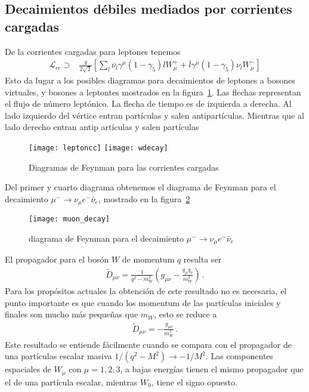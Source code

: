 \subsection{Decaimientos débiles mediados por corrientes cargadas}
\begin{frame}
De la corrientes cargadas para leptones tenemos
\begin{align}
  \mathcal{L}_{cc}\supset&\frac{g}{2\sqrt{2}}\left[\sum_l\bar{\nu_l}\gamma^\mu(1-\gamma_5)l W_\mu^++\bar{l}\gamma^\mu(1-\gamma_5)\nu_l W_\mu^-\right]
\end{align}
Esto da lugar a los posibles diagramas para decaimientos de leptones a bosones virtuales, y bosones a leptontes mostrados en la figura~\ref{fig:leptoncc}. Las flechas representan el flujo de número leptónico. La flecha de tiempo es de izquierda a derecha. Al lado izquierdo del vértice entran partículas y salen antipartículas. Mientras que al lado derecho entran antip artículas y salen partículas
\begin{figure}
  \centering
  \texttt{[image: leptoncc]}
\qquad  \texttt{[image: wdecay]}

  \caption{Diagramas de Feynman para las corrientes cargadas}
  \label{fig:leptoncc}
\end{figure}
Del primer y cuarto diagrama obtenemos el diagrama de Feynman para el decaimiento $\mu^-\to \nu_\mu e^-\bar{\nu}_e$, mostrado en la figura~\ref{fig:muondecay}
\begin{figure}
  \centering
  \texttt{[image: muon\_decay]}
  \caption{diagrama de Feynman para el decaimiento $\mu^-\to \nu_\mu e^-\bar{\nu}_e$}
  \label{fig:muondecay}
\end{figure}
El propagador para el bosón $W$ de momentum $q$ resulta ser
\begin{align}
  \widetilde{D}_{\mu\nu}=\frac{1}{q^2-m_W^2}\left(g_{\mu\nu}-\frac{q_\mu q_\nu}{m_W^2}\right)\,.
\end{align}
Para los propósitos actuales la obtención de este resultado no es necesaria, el punto importante es que cuando los momentum de las partículas iniciales y finales son mucho más pequeñas que $m_W$, esto se reduce a
\begin{align}
  \widetilde{D}_{\mu\nu}=-\frac{g_{\mu\nu}}{m_W^2}\,.
\end{align}
Este resultado se entiende fácilmente cuando se compara con el propagador de una partículas escalar masiva $1/(q^2-M^2)\to-1/M^2$. Las componentes espaciales de $W_\mu$ con $\mu=1,2,3$, a bajas energías tienen el mismo propagador que el de una partícula escalar, mientras $W_0$, tiene el signo opuesto.


\end{frame}

